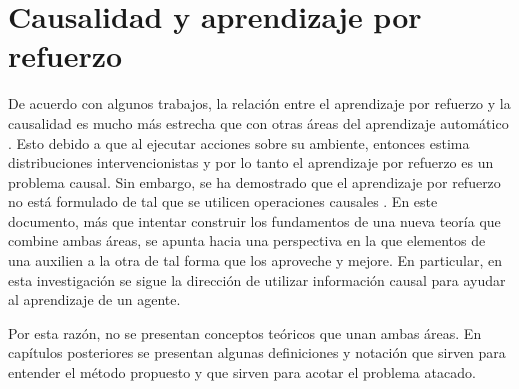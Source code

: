 




\section{Causalidad y aprendizaje por refuerzo}

De acuerdo con algunos trabajos, la relación entre el aprendizaje por refuerzo
y la causalidad es mucho más estrecha que con otras áreas del
aprendizaje automático \cite{schlkopf2019causality} \cite{Gershman2017}. Esto debido a que al ejecutar acciones sobre su ambiente, entonces
estima distribuciones intervencionistas y por lo tanto el aprendizaje por refuerzo es un problema causal. Sin embargo, se ha demostrado que el aprendizaje
por refuerzo no está formulado de tal que se utilicen operaciones
causales \cite{gonzalezsoto2019reinforcement}.
En este documento, más que intentar construir los fundamentos de una nueva 
teoría que combine ambas áreas, se apunta hacia una perspectiva
en la que elementos de una auxilien a la otra de tal forma que
los aproveche y mejore. En particular, en esta investigación
se sigue la dirección de utilizar información causal para ayudar al 
aprendizaje de un agente.

Por esta razón, no se presentan conceptos teóricos que unan ambas áreas. 
En capítulos posteriores se presentan algunas definiciones y notación
que sirven para entender el método propuesto y que sirven para acotar el
problema atacado.
